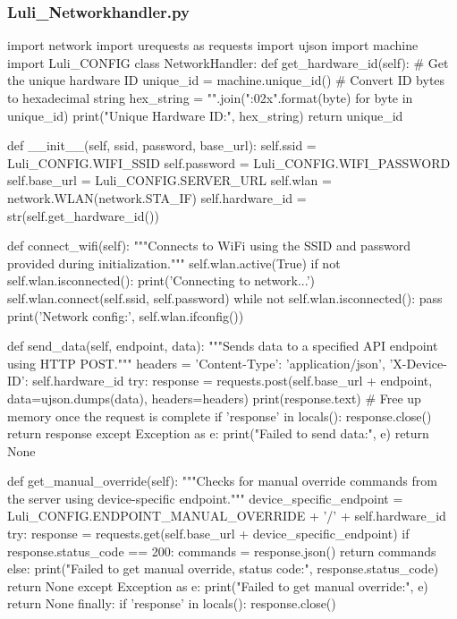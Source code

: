 \documentclass[12pt]{article} %
\begin{document}
\subsubsection{Luli\_Networkhandler.py}
\begin{pythoncode}[caption={Pico W Network Handler Code}]
    import network
    import urequests as requests
    import ujson
    import machine
    import Luli_CONFIG
    class NetworkHandler:
        def get_hardware_id(self):
            # Get the unique hardware ID
            unique_id = machine.unique_id()
            # Convert ID bytes to hexadecimal string
            hex_string = "".join("{:02x}".format(byte) for byte in unique_id)
            print("Unique Hardware ID:", hex_string)
            return unique_id
        
    
        
        def __init__(self, ssid, password, base_url):
            self.ssid = Luli_CONFIG.WIFI_SSID
            self.password = Luli_CONFIG.WIFI_PASSWORD
            self.base_url = Luli_CONFIG.SERVER_URL
            self.wlan = network.WLAN(network.STA_IF)
            self.hardware_id = str(self.get_hardware_id())
    
        def connect_wifi(self):
            """Connects to WiFi using the SSID and password provided during initialization."""
            self.wlan.active(True)
            if not self.wlan.isconnected():
                print('Connecting to network...')
                self.wlan.connect(self.ssid, self.password)
                while not self.wlan.isconnected():
                    pass
            print('Network config:', self.wlan.ifconfig())
    
        def send_data(self, endpoint, data):
            """Sends data to a specified API endpoint using HTTP POST."""
            headers = {'Content-Type': 'application/json', 'X-Device-ID': self.hardware_id}
            try:
                response = requests.post(self.base_url + endpoint, data=ujson.dumps(data), headers=headers)
                print(response.text)
                # Free up memory once the request is complete
                if 'response' in locals():
                    response.close()
                return response
            except Exception as e:
                print("Failed to send data:", e)
                return None
            
        
        def get_manual_override(self):
            """Checks for manual override commands from the server using device-specific endpoint."""
            device_specific_endpoint = Luli_CONFIG.ENDPOINT_MANUAL_OVERRIDE + '/' + self.hardware_id
            try:
                response = requests.get(self.base_url + device_specific_endpoint)
                if response.status_code == 200:
                    commands = response.json()
                    return commands
                else:
                    print("Failed to get manual override, status code:", response.status_code)
                    return None
            except Exception as e:
                print("Failed to get manual override:", e)
                return None
            finally:
                if 'response' in locals():
                    response.close()
    

\end{pythoncode}
\end{document}
